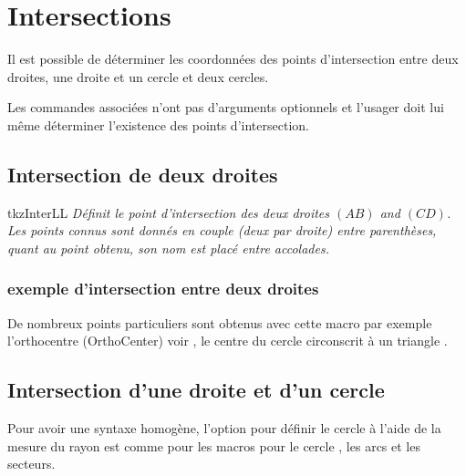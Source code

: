 

\section{Intersections}



Il est possible de déterminer les coordonnées des points d'intersection entre deux droites, une droite et un cercle et deux cercles.

Les commandes associées n'ont pas d'arguments optionnels et l'usager doit lui même déterminer l'existence des points d'intersection.


\subsection{Intersection de deux droites}


 \begin{NewMacroBox}{tkzInterLL}{}
\emph{Définit le point d'intersection  des deux droites $(AB)$ and $(CD)$. Les points connus sont donnés en couple (deux par droite) entre parenthèses, quant au point obtenu, son nom est placé entre accolades.}       

 \end{NewMacroBox}   
% 

\medskip
\subsubsection{exemple d'intersection entre deux droites}
\begin{center}
\begin{tkzexample}[vbox]
\end{tkzexample}
\end{center}  

De nombreux points particuliers sont obtenus avec cette macro par exemple l'orthocentre (OrthoCenter) voir , le centre du cercle circonscrit à un triangle . 

\newpage
\subsection{Intersection d'une droite et d'un cercle} %
\label{sub:intersection_d_une_droite_et_d_un_cercle}
Pour avoir une syntaxe homogène, l'option pour définir le cercle à l'aide de la mesure du rayon est  comme pour les macros pour  le cercle , les arcs et les secteurs.    

